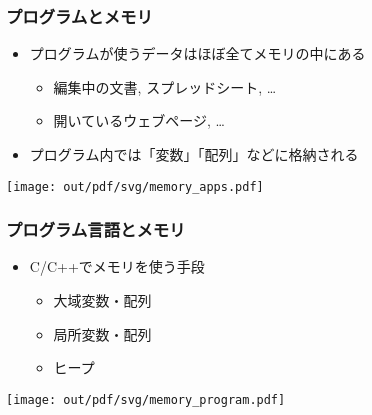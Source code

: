 \documentclass[12pt,dvipdfmx]{beamer}
\begin{document}
\begin{frame}
  \frametitle{プログラムとメモリ}
  \begin{itemize}
  \item プログラムが使うデータはほぼ全てメモリの中にある
    \begin{itemize}
    \item 編集中の文書, スプレッドシート, \ldots
    \item 開いているウェブページ, \ldots
    \end{itemize}

  \item プログラム内では「変数」「配列」などに格納される
    
  \end{itemize}
  \begin{center}
    \texttt{[image: out/pdf/svg/memory\_apps.pdf]}
  \end{center}
\end{frame}
    
\begin{frame}
  \frametitle{プログラム言語とメモリ}
  \begin{itemize}
  \item C/C++でメモリを使う手段
    \begin{itemize}
    \item 大域変数・配列
    \item 局所変数・配列
    \item ヒープ
    \end{itemize}
  \end{itemize}

  \begin{center}
    \texttt{[image: out/pdf/svg/memory\_program.pdf]}
  \end{center}
\end{frame}
\end{document}
